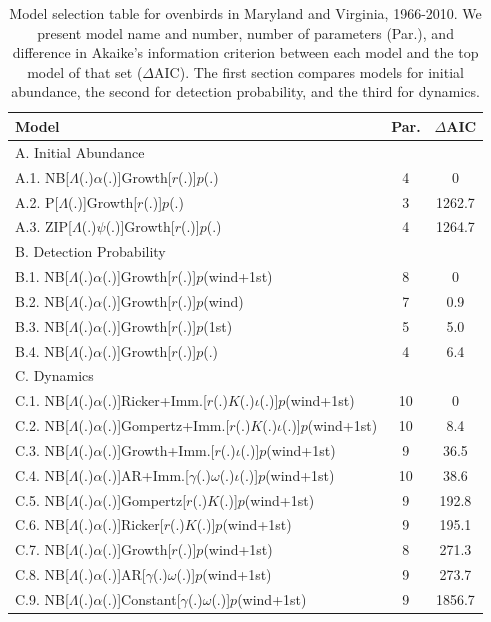 \documentclass[12pt]{article}
\begin{document}
\begin{table}
  \centering
  \small
  \caption{Model selection table for ovenbirds in Maryland and Virginia,
    1966-2010.  We present model name
    and number, number of parameters (Par.), and difference in Akaike's
    information criterion between each model and the top model of that
    set ($\Delta$AIC).  The first section compares
    models for initial abundance, the second for detection probability,
    and the third for dynamics.}
  \begin{tabular}[h]{lcc}
\hline
Model	&Par.	&$\Delta$AIC	\\
\hline
A. Initial Abundance && \\
A.1. NB[$\Lambda$(.)$\alpha$(.)]Growth[$r$(.)]$p$(.)	&4	&0\\
A.2. P[$\Lambda$(.)]Growth[$r$(.)]$p$(.)	&3	&1262.7\\
A.3. ZIP[$\Lambda$(.)$\psi$(.)]Growth[$r$(.)]$p$(.)	&4 &1264.7\\
\hline
B. Detection Probability && \\
B.1. NB[$\Lambda$(.)$\alpha$(.)]Growth[$r$(.)]$p$(wind+1st)	&8
&0	\\
B.2. NB[$\Lambda$(.)$\alpha$(.)]Growth[$r$(.)]$p$(wind)	&7	&0.9\\
B.3. NB[$\Lambda$(.)$\alpha$(.)]Growth[$r$(.)]$p$(1st)	&5	&5.0\\
B.4. NB[$\Lambda$(.)$\alpha$(.)]Growth[$r$(.)]$p$(.)	&4	&6.4\\
\hline
C. Dynamics && \\
C.1. NB[$\Lambda$(.)$\alpha$(.)]Ricker+Imm.[$r$(.)$K$(.)$\iota$(.)]$p$(wind+1st)
&10	&0	\\
C.2. NB[$\Lambda$(.)$\alpha$(.)]Gompertz+Imm.[$r$(.)$K$(.)$\iota$(.)]$p$(wind+1st)
&10	&8.4 \\
C.3. NB[$\Lambda$(.)$\alpha$(.)]Growth+Imm.[$r$(.)$\iota$(.)]$p$(wind+1st)
&9	&36.5\\
C.4. NB[$\Lambda$(.)$\alpha$(.)]AR+Imm.[$\gamma$(.)$\omega$(.)$\iota$(.)]$p$(wind+1st)
&10	&38.6\\
C.5. NB[$\Lambda$(.)$\alpha$(.)]Gompertz[$r$(.)$K$(.)]$p$(wind+1st)
&9	&192.8\\
C.6. NB[$\Lambda$(.)$\alpha$(.)]Ricker[$r$(.)$K$(.)]$p$(wind+1st)
&9	&195.1\\
C.7. NB[$\Lambda$(.)$\alpha$(.)]Growth[$r$(.)]$p$(wind+1st)	&8
&271.3\\
C.8. NB[$\Lambda$(.)$\alpha$(.)]AR[$\gamma$(.)$\omega$(.)]$p$(wind+1st)
&9	&273.7\\
C.9. NB[$\Lambda$(.)$\alpha$(.)]Constant[$\gamma$(.)$\omega$(.)]$p$(wind+1st)
&9	&1856.7\\
\hline
\end{tabular}
\end{table}
\end{document}
